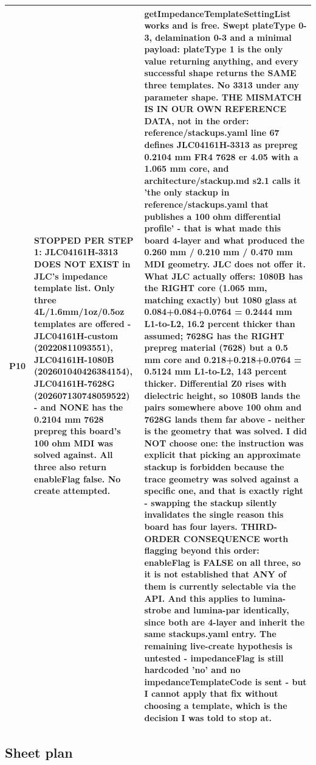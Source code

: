 \documentclass[11pt,a4paper]{article}
\begin{document}
{\begin{longtable}{lp{5.2cm}p{7.2cm}}
P10 & STOPPED PER STEP 1: JLC04161H-3313 DOES NOT EXIST in JLC's impedance template list. Only three 4L/1.6mm/1oz/0.5oz templates are offered - JLC04161H-custom (20220811093551), JLC04161H-1080B (202601040426384154), JLC04161H-7628G (202607130748059522) - and NONE has the 0.2104 mm 7628 prepreg this board's 100 ohm MDI was solved against. All three also return enableFlag false. No create attempted. & getImpedanceTemplateSettingList works and is free. Swept plateType 0-3, delamination 0-3 and a minimal payload: plateType 1 is the only value returning anything, and every successful shape returns the SAME three templates. No 3313 under any parameter shape. THE MISMATCH IS IN OUR OWN REFERENCE DATA, not in the order: reference/stackups.yaml line 67 defines JLC04161H-3313 as prepreg 0.2104 mm FR4 7628 er 4.05 with a 1.065 mm core, and architecture/stackup.md s2.1 calls it 'the only stackup in reference/stackups.yaml that publishes a 100 ohm differential profile' - that is what made this board 4-layer and what produced the 0.260 mm / 0.210 mm / 0.470 mm MDI geometry. JLC does not offer it. What JLC actually offers: 1080B has the RIGHT core (1.065 mm, matching exactly) but 1080 glass at 0.084+0.084+0.0764 = 0.2444 mm L1-to-L2, 16.2 percent thicker than assumed; 7628G has the RIGHT prepreg material (7628) but a 0.5 mm core and 0.218+0.218+0.0764 = 0.5124 mm L1-to-L2, 143 percent thicker. Differential Z0 rises with dielectric height, so 1080B lands the pairs somewhere above 100 ohm and 7628G lands them far above - neither is the geometry that was solved. I did NOT choose one: the instruction was explicit that picking an approximate stackup is forbidden because the trace geometry was solved against a specific one, and that is exactly right - swapping the stackup silently invalidates the single reason this board has four layers. THIRD-ORDER CONSEQUENCE worth flagging beyond this order: enableFlag is FALSE on all three, so it is not established that ANY of them is currently selectable via the API. And this applies to lumina-strobe and lumina-par identically, since both are 4-layer and inherit the same stackups.yaml entry. The remaining live-create hypothesis is untested - impedanceFlag is still hardcoded 'no' and no impedanceTemplateCode is sent - but I cannot apply that fix without choosing a template, which is the decision I was told to stop at. \\
\bottomrule
\end{longtable}
}
\subsection*{Sheet plan}
\end{document}
